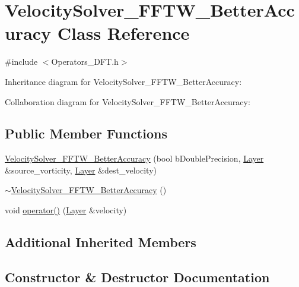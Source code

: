 \hypertarget{class_velocity_solver___f_f_t_w___better_accuracy}{}\section{Velocity\+Solver\+\_\+\+F\+F\+T\+W\+\_\+\+Better\+Accuracy Class Reference}
\label{class_velocity_solver___f_f_t_w___better_accuracy}


{\ttfamily \#include $<$Operators\+\_\+\+D\+F\+T.\+h$>$}



Inheritance diagram for Velocity\+Solver\+\_\+\+F\+F\+T\+W\+\_\+\+Better\+Accuracy\+:


Collaboration diagram for Velocity\+Solver\+\_\+\+F\+F\+T\+W\+\_\+\+Better\+Accuracy\+:
\subsection*{Public Member Functions}
\begin{DoxyCompactItemize}
\item 
\hyperlink{class_velocity_solver___f_f_t_w___better_accuracy_a1a2a303a67ea83a7cb8010f546fdc13d}{Velocity\+Solver\+\_\+\+F\+F\+T\+W\+\_\+\+Better\+Accuracy} (bool b\+Double\+Precision, \hyperlink{struct_layer}{Layer} \&source\+\_\+vorticity, \hyperlink{struct_layer}{Layer} \&dest\+\_\+velocity)
\item 
\hyperlink{class_velocity_solver___f_f_t_w___better_accuracy_a11a3f4826557c95605548a8a1ff9c65e}{$\sim$\+Velocity\+Solver\+\_\+\+F\+F\+T\+W\+\_\+\+Better\+Accuracy} ()
\item 
void \hyperlink{class_velocity_solver___f_f_t_w___better_accuracy_a4ae34b500da178acfb0555c03e665041}{operator()} (\hyperlink{struct_layer}{Layer} \&velocity)
\end{DoxyCompactItemize}
\subsection*{Additional Inherited Members}


\subsection{Constructor \& Destructor Documentation}
\hypertarget{class_velocity_solver___f_f_t_w___better_accuracy_a1a2a303a67ea83a7cb8010f546fdc13d}{}
